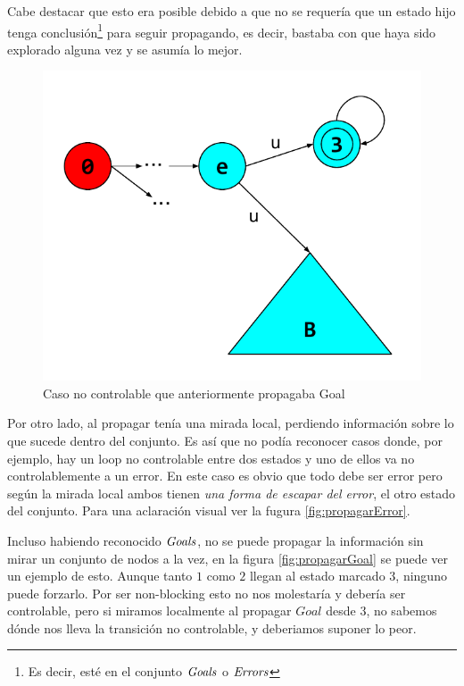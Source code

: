 Cabe destacar que esto era posible debido a que no se requería que un estado hijo tenga conclusión\footnote{Es decir, esté en el conjunto $\mathit{Goals}$ o $\mathit{Errors}$} para seguir propagando, es decir, bastaba con que haya sido explorado alguna vez y se asumía lo mejor.
\begin{figure}[htb]
 \centering
 \includegraphics[width=\linewidth/2]{figures/FalenciasErrores.pdf}
 \caption{Caso no controlable que anteriormente propagaba Goal}
 \label{fig:falenciasErrores}
\end{figure}

Por otro lado, al propagar tenía una mirada local, perdiendo información sobre lo que sucede dentro del conjunto. Es así que no podía reconocer casos donde, por ejemplo, hay un loop no controlable entre dos estados y uno de ellos va no controlablemente a un error. En este caso es obvio que todo debe ser error pero según la mirada local ambos tienen \textit{una forma de escapar del error}, el otro estado del conjunto. Para una aclaración visual ver la fugura \ref{fig:propagarError}.

Incluso habiendo reconocido $\mathit{Goals}$, no se puede propagar la información sin mirar un conjunto de nodos a la vez, en la figura \ref{fig:propagarGoal} se puede ver un ejemplo de esto. Aunque tanto $1$ como $2$ llegan al estado marcado $3$, ninguno puede forzarlo. Por ser non-blocking esto no nos molestaría y debería ser controlable, pero si miramos localmente al propagar $Goal$ desde $3$, no sabemos dónde nos lleva la transición no controlable, y deberiamos suponer lo peor.

